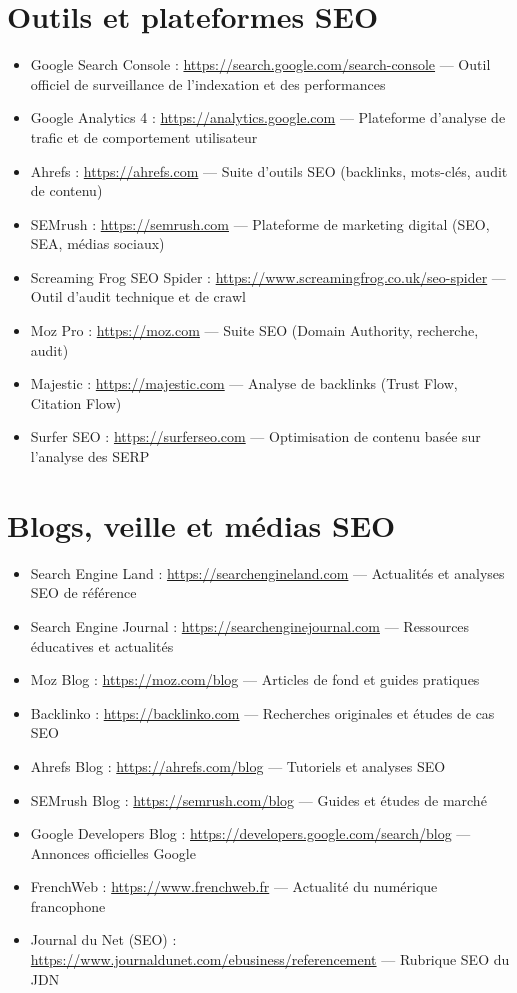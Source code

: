 \documentclass[12pt,a4paper,twoside]{report}
\begin{document}
\section*{Outils et plateformes SEO}
\begin{itemize}
    \item Google Search Console : \url{https://search.google.com/search-console} — Outil officiel de surveillance de l'indexation et des performances
    \item Google Analytics 4 : \url{https://analytics.google.com} — Plateforme d'analyse de trafic et de comportement utilisateur
    \item Ahrefs : \url{https://ahrefs.com} — Suite d'outils SEO (backlinks, mots-clés, audit de contenu)
    \item SEMrush : \url{https://semrush.com} — Plateforme de marketing digital (SEO, SEA, médias sociaux)
    \item Screaming Frog SEO Spider : \url{https://www.screamingfrog.co.uk/seo-spider} — Outil d'audit technique et de crawl
    \item Moz Pro : \url{https://moz.com} — Suite SEO (Domain Authority, recherche, audit)
    \item Majestic : \url{https://majestic.com} — Analyse de backlinks (Trust Flow, Citation Flow)
    \item Surfer SEO : \url{https://surferseo.com} — Optimisation de contenu basée sur l'analyse des SERP
\end{itemize}

\section*{Blogs, veille et médias SEO}
\begin{itemize}
    \item Search Engine Land : \url{https://searchengineland.com} — Actualités et analyses SEO de référence
    \item Search Engine Journal : \url{https://searchenginejournal.com} — Ressources éducatives et actualités
    \item Moz Blog : \url{https://moz.com/blog} — Articles de fond et guides pratiques
    \item Backlinko : \url{https://backlinko.com} — Recherches originales et études de cas SEO
    \item Ahrefs Blog : \url{https://ahrefs.com/blog} — Tutoriels et analyses SEO
    \item SEMrush Blog : \url{https://semrush.com/blog} — Guides et études de marché
    \item Google Developers Blog : \url{https://developers.google.com/search/blog} — Annonces officielles Google
    \item FrenchWeb : \url{https://www.frenchweb.fr} — Actualité du numérique francophone
    \item Journal du Net (SEO) : \url{https://www.journaldunet.com/ebusiness/referencement} — Rubrique SEO du JDN
\end{itemize}
\end{document}
